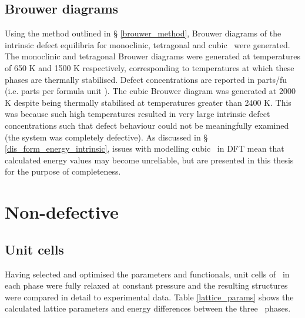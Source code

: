 \subsection{Brouwer diagrams} \label{intrinsicbrouwer}

Using the method outlined in § \ref{brouwer_method}, Brouwer diagrams of the intrinsic defect equilibria for monoclinic, tetragonal and cubic \zirconia\ were generated.  The monoclinic and tetragonal Brouwer diagrams were generated at temperatures of 650 K and 1500 K respectively, corresponding to temperatures at which these phases are thermally stabilised. Defect concentrations are reported in parts/fu (i.e. parts per formula unit \zirconia). The cubic Brouwer diagram was generated at 2000 K despite being thermally stabilised at temperatures greater than 2400 K. This was because such high temperatures resulted in very large intrinsic defect concentrations such that defect behaviour could not be meaningfully examined (the system was completely defective). As discussed in § \ref{dis_form_energy_intrinsic}, issues with modelling cubic \zirconia\ in DFT mean that calculated energy values may become unreliable, but are presented in this thesis for the purpose of completeness.

\section{Non-defective \zirconia}

\subsection{Unit cells}

Having selected and optimised the parameters and functionals, unit cells of \zirconia\ in each phase were fully relaxed at constant pressure and the resulting structures were compared in detail to experimental data. Table \ref{lattice_params} shows the calculated lattice parameters and energy differences between the three \zirconia\ phases. 

